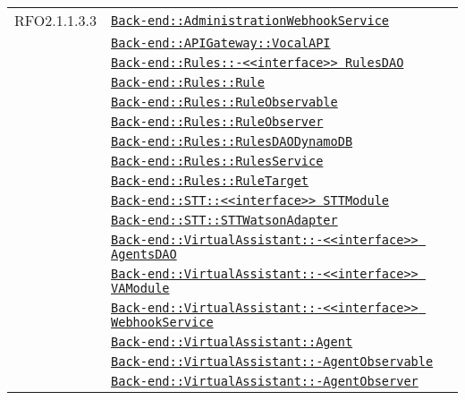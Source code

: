 \begin{longtable}{|>{\centering}m{3cm}|m{10cm}<{\centering}|}
RFO2.1.1.3.3 & \hyperref[Back-end::AdministrationWebhookService]{\texttt{Back-end::AdministrationWebhookService}}\\
& \hyperref[Back-end::APIGateway::VocalAPI]{\texttt{Back-end::APIGateway::VocalAPI}}\\
& \hyperref[Back-end::Rules::<<interface>> RulesDAO]{\texttt{Back-end::Rules::-\linebreak <<interface>> RulesDAO}}\\
& \hyperref[Back-end::Rules::Rule]{\texttt{Back-end::Rules::Rule}}\\
& \hyperref[Back-end::Rules::RuleObservable]{\texttt{Back-end::Rules::RuleObservable}}\\
& \hyperref[Back-end::Rules::RuleObserver]{\texttt{Back-end::Rules::RuleObserver}}\\
& \hyperref[Back-end::Rules::RulesDAODynamoDB]{\texttt{Back-end::Rules::RulesDAODynamoDB}}\\
& \hyperref[Back-end::Rules::RulesService]{\texttt{Back-end::Rules::RulesService}}\\
& \hyperref[Back-end::Rules::RuleTarget]{\texttt{Back-end::Rules::RuleTarget}}\\
& \hyperref[Back-end::STT::<<interface>> STTModule]{\texttt{Back-end::STT::<<interface>> STTModule}}\\
& \hyperref[Back-end::STT::STTWatsonAdapter]{\texttt{Back-end::STT::STTWatsonAdapter}}\\
& \hyperref[Back-end::VirtualAssistant::<<interface>> AgentsDAO]{\texttt{Back-end::VirtualAssistant::-\linebreak <<interface>> AgentsDAO}}\\
& \hyperref[Back-end::VirtualAssistant::<<interface>> VAModule]{\texttt{Back-end::VirtualAssistant::-\linebreak <<interface>> VAModule}}\\
& \hyperref[Back-end::VirtualAssistant::<<interface>> WebhookService]{\texttt{Back-end::VirtualAssistant::-\linebreak <<interface>> WebhookService}}\\
& \hyperref[Back-end::VirtualAssistant::Agent]{\texttt{Back-end::VirtualAssistant::Agent}}\\
& \hyperref[Back-end::VirtualAssistant::AgentObservable]{\texttt{Back-end::VirtualAssistant::-\linebreak AgentObservable}}\\
& \hyperref[Back-end::VirtualAssistant::AgentObserver]{\texttt{Back-end::VirtualAssistant::-\linebreak AgentObserver}}\\

\end{longtable}
